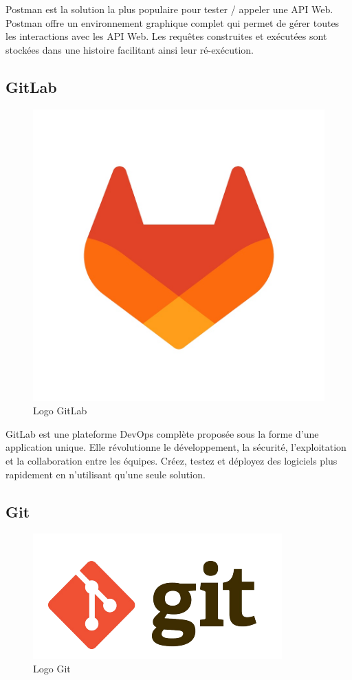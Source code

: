Postman est la solution la plus populaire pour tester / appeler une API Web. Postman offre un environnement graphique complet qui permet de gérer toutes les interactions avec les API Web. Les requêtes construites et exécutées sont stockées dans une histoire facilitant ainsi leur ré-exécution. \cite{Postman}

\subsection{GitLab}

\begin{figure}[H]
    \centering
    \includegraphics[scale=0.1]{Logos/gitlab.jpg}
    \caption{Logo GitLab}
\end{figure}

GitLab est une plateforme DevOps complète proposée
sous la forme d’une application unique. Elle révolutionne le
développement, la sécurité, l’exploitation et la collaboration
entre les équipes. Créez, testez et déployez des logiciels plus
rapidement en n’utilisant qu’une seule solution. \cite{GitLab}

\subsection{Git}

\begin{figure}[H]
    \centering
    \includegraphics[scale=0.5]{Logos/git.png}
    \caption{Logo Git}
\end{figure}

